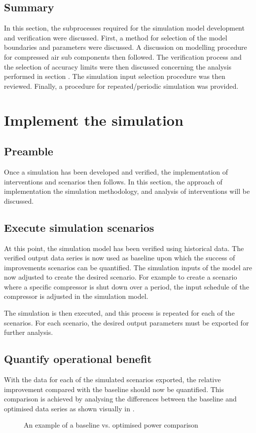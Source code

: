 	\subsection{Summary}	
In this section, the subprocesses required for the simulation model development and verification were discussed. First, a method for selection of the model boundaries and parameters were discussed. A discussion on modelling procedure for compressed air sub components then followed. The verification process and the selection of accuracy limits were then discussed concerning the analysis performed in section . The simulation input selection procedure was then reviewed. Finally, a procedure for repeated/periodic simulation was provided.

\section{Implement the simulation}
	\subsection{Preamble}
		Once a simulation has been developed and verified, the implementation of interventions and scenarios then follows. In this section, the approach of implementation the simulation methodology, and analysis of interventions will be discussed.
	\subsection{Execute simulation scenarios}
		At this point, the simulation model has been verified using historical data. The verified output data series is now used as baseline upon which the success of improvements scenarios can be quantified.  The simulation inputs of the model are now adjusted to create the desired scenario. For example to create a scenario where a specific compressor is shut down over a period, the input schedule of the compressor is adjusted in the simulation model.
		\par
		The simulation is then executed, and this process is repeated for each of the scenarios. For each scenario, the desired output parameters must be exported for further analysis.

	\subsection{Quantify operational benefit}
		With the data for each of the simulated scenarios exported, the relative improvement compared with the baseline should now be quantified. This comparison is achieved by analysing the differences between the baseline and optimised data series as shown visually in .
		\begin{figure}[h]
			\centering
			
			\caption{An example of a baseline vs. optimised power comparison}
			\label{fig: Savings Power.}
		\end{figure} 
		
